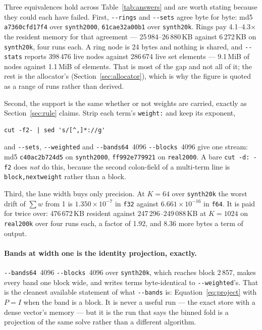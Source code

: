 \documentclass[11pt,a4paper]{article}
\newcommand{\flag}[1]{\texttt{-{}-#1}}
\begin{document}
Three equivalences hold across Table~\ref{tab:answers} and are worth stating
because they could each have failed. First, \flag{rings} and \flag{sets}
agree byte for byte: md5 \texttt{a7360cfd17f4} over \texttt{synth2000},
\texttt{61cae32a00b1} over \texttt{synth20k}. Rings pay 4.1--4.3$\times$ the
resident memory for that agreement --- 25\,984--26\,880\,KB against
6\,272\,KB on \texttt{synth20k}, four runs each. A ring node is 24 bytes and
nothing is shared, and \flag{stats} reports 398\,476 live nodes against
286\,674 live set elements --- 9.1\,MiB of nodes against 1.1\,MiB of
elements. That is most of the gap and not all of it; the rest is the allocator's
(Section~\ref{sec:allocator}), which is why the figure is quoted as a range of
runs rather than derived.

Second, the support is the same whether or not weights are carried, exactly as
Section~\ref{sec:rule} claims. Strip each term's \texttt{weight:} and keep
its exponent,

\begin{lstlisting}
cut -f2- | sed 's/[^,]*://g'
\end{lstlisting}

\noindent and \flag{sets}, \flag{weighted} and \flag{bands64}~4096
\flag{blocks}~4096 give one stream: md5 \texttt{c40ac2b724d5} on
\texttt{synth2000}, \texttt{ff992e779921} on \texttt{real2000}. A bare
\texttt{cut -d: -f2} does \emph{not} do this, because the second colon-field
of a multi-term line is \texttt{block,nextweight} rather than a block.

Third, the lane width buys only precision. At $K=64$ over \texttt{synth20k} the
worst drift of $\sum w$ from 1 is $1.350\times10^{-7}$ in \texttt{f32} against
$6.661\times10^{-16}$ in \texttt{f64}. It is paid for twice over: 476\,672\,KB
resident against 247\,296--249\,088\,KB at $K=1024$ on \texttt{real200k} over
four runs each, a factor of 1.92, and 8.36 more bytes a term of output.

\paragraph{Bands at width one is the identity projection, exactly.}
\flag{bands64}~4096 \flag{blocks}~4096 over \texttt{synth20k}, which reaches
block 2\,857, makes every band one block wide, and writes terms byte-identical
to \flag{weighted}'s. That is the cleanest available statement of what
\flag{bands} is: Equation~\eqref{eq:project} with $P = I$ when the band is a block.
It is never a useful run --- the exact store with a dense vector's memory ---
but it is the run that says the binned fold is a projection of the same solve
rather than a different algorithm.
\end{document}
